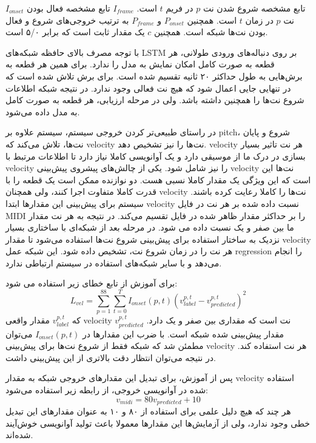 $I_{onset}$ تابع مشخصه شروع شدن نت $p$ در فریم $t$ است. $I_{frame}$ تابع مشخصه
فعال بودن نت $p$ در زمان $t$ است. همچنین $P_{onset}$ و $P_{frame}$ به ترتیب
خروجی‌های شروع و فعال بودن نت‌ها شبکه است. همچنین $c$ یک مقدار ثابت است که برابر
۵/۰ است.

با توجه مصرف بالای حافظه شبکه‌های \gls{LSTM} بر روی دنباله‌های ورودی طولانی، هر
قطعه به صورت کامل امکان نمایش به مدل را ندارد. برای همین هر قطعه به برش‌هایی به
طول حداکثر ۲۰ ثانیه تقسیم شده است. برای برش تلاش شده است که در تنهایی جایی اعمال
شود که هیچ نت فعالی وجود ندارد. در نتیجه شبکه اطلاعات شروع نت‌ها را همچنین داشته
باشد. ولی در مرحله ارزیابی، هر قطعه به صورت کامل به مدل داده می‌شود.

در راستای طبیعی‌تر کردن خروجی سیستم، سیستم علاوه بر \gls{pitch}، شروع و پایان
نت‌ها، تلاش می‌کند که \gls{velocity} نت‌ها را نیز تشخیص دهد. \gls{velocity} هر
نت تاثیر بسیار بسازی در درک ما از موسیقی دارد و یک آوانویسی کاملا نیاز دارد تا
اطلاعات مرتبط با \gls{velocity} را نیز شامل شود. یکی از چالش‌های پیشروی پیش‌بینی
\gls{velocity} نت‌ها این است که این ویژگی یک مقدار کاملا نسبی هست. دو نوازنده
ممکن است یک قطعه را با قدرت کاملا متفاوت اجرا کنند، ولی همچنان \gls{velocity}
نت‌ها را کاملا رعایت کرده باشند. سیستم برای پیش‌بینی این مقدارها ابتدا
\gls{velocity} نسبت داده شده بر هر نت در فایل \gls{MIDI} را بر حداکثر مقدار ظاهر
شده در فایل تقسیم می‌کند. در نتیجه به هر نت مقدار ما بین صفر و یک نسبت داده می
شود. در مرحله بعد از شبکه‌ای با ساختاری بسیار نزدیک به ساختار استفاده برای
پیش‌بینی شروع نت‌ها استفاده می‌شود تا مقدار \gls{velocity} هر نت را در زمان شروع
نت، تشخیص داده شود. این شبکه عمل \gls{regression} را انجام می‌دهد و با سایر
شبکه‌های استفاده در سیستم ارتباطی ندارد.

برای آموزش از تابع خطای زیر استفاده می شود:
\begin{equation}
    L_{vel} = \sum_{p=1}^{88} \sum_{t=0}^{T} I_{onset}(p, t) (v_{label}^{p,t} - v_{predicted}^{p,t})^{2}
\end{equation}
که $v_{label}^{p, t}$ مقدار واقعی \gls{velocity} نت است که مقداری بین صفر و یک
دارد. $v_{predicted}^{p,t}$ مقدار پیش‌بینی شده شبکه است. با ضرب این مقدارها در
$I_{onset}(p, t)$ می‌توان مطمئن شد که شبکه فقط از شروع نت‌ها برای پیش‌بینی
\gls{velocity} هر نت استفاده کند. در نتیجه می‌توان انتظار دقت بالاتری از این پیش‌بینی داشت.

پس از آموزش، برای تبدیل این مقدارهای خروجی شبکه به مقدار \gls{velocity} استفاده
شده در آوانویسی خروجی، از رابطه زیر استفاده می‌شود:
\begin{equation}
    v_{midi} = 80 v_{predicted} + 10
\end{equation}
هر چند که هیچ دلیل علمی برای استفاده از ۸۰ و ۱۰ به عنوان مقدارهای این تبدیل خطی
وجود ندارد، ولی از آزمایش‌ها این مقدارها معمولا باعث تولید آوانویسی خوش‌آیند
شده‌اند.

